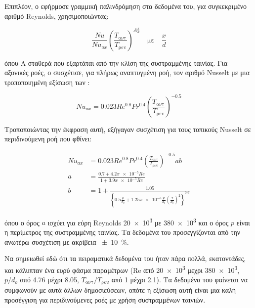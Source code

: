 Επιπλέον, ο \citeauthor{1970_Blackwelder} \cite{1970_Blackwelder} εφήρμοσε γραμμική παλινδρόμηση στα δεδομένα του, για συγκεκριμένο αριθμό Reynolds, χρησιμοποιώντας:

\begin{equation}\label{black}
\displaystyle\frac{Nu}{Nu_{ax}}\left(\displaystyle\frac{T_{\text{αντ}}}{T_{\text{ρευ}}} \right)^{A\frac{x}{d}} \quad \text{με} \quad \displaystyle\frac{x}{d}
\end{equation}

\noindent όπου Α σταθερά που εξαρτάται από την κλίση της συστραμμένης ταινίας. Για αξονικές ροές, ο \citeauthor{1973_KlepperO._CONF} \cite{1973_KlepperO._CONF} συσχέτισε, για πλήρως αναπτυγμένη ροή, τον αριθμό Nusselt με μια τροποποιημένη εξίσωση των \citeauthor{1930_Dittus} \cite{1930_Dittus}:

\begin{equation}\label{eq:dittus}
Nu_{ax} = 0.023 Re^{0.8} Pr^{0.4} \left(\displaystyle\frac{T_{\text{αντ}}}{T_{\text{ρευ}}}\right) ^ {-0.5}
\end{equation}

\noindent Τροποποιώντας την έκφραση αυτή, εξήγαγαν συσχέτιση για τους τοπικούς Nusselt σε περιδινούμενη ροή που φθίνει:

\begin{align}\label{eq:klepp}
Nu_{ax} &= 0.023 Re^{0.8} Pr^{0.4} \left(\displaystyle\frac{T_{\text{αντ}}}{T_{\text{ρευ}}}\right) ^ {-0.5} a b\\[2pt]
a &= \displaystyle\frac{0.7 + 4.2x \num{e-5}Re}{1 + 3.9x \num{e-5}Re}\nonumber\\[2pt]
b &= 1 + \displaystyle\frac{1.05}{\left\{0.5\frac{p}{d_o} + 1.25x\num{e-3}\frac{p}{d_o}\left( \frac{x}{d_o} \right)^2 \right\}^{0.6}}\nonumber
\end{align}

\noindent όπου ο όρος $a$ ισχύει για εύρη Reynolds \num{20e+3} με \num{380e+3} και ο όρος $p$ είναι η περίμετρος της συστραμμένης ταινίας. Τα δεδομένα του \citeauthor{1973_KlepperO._CONF} προσεγγίζονται από την ανωτέρω συσχέτιση με ακρίβεια \qty{\pm 10}{\percent}.

Να σημειωθεί εδώ ότι τα πειραματικά δεδομένα του \citeauthor{1973_KlepperO._CONF} ήταν πάρα πολλά, εκατοντάδες, και κάλυπταν ένα ευρύ φάσμα παραμέτρων (Re από \num{20e+3} μεχρι \num{380e+3}, $p/d_o$ από 4.76 μέχρι 8.05, $T_{\text{αντ}}/T_{\text{ρευ}}$ από 1 μέχρι 2.1). Τα δεδομένα του \citeauthor{1973_KlepperO._CONF} φαίνεται να συμφωνούν με αυτά άλλων δημοσιεύσεων, οπότε η εξίσωση αυτή είναι μια καλή προσέγγιση για περιδινούμενες ροές με χρήση συστραμμένων ταινιών.


